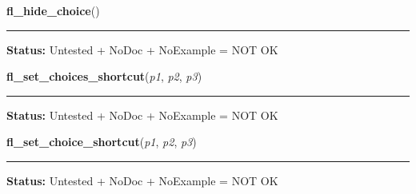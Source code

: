     \vspace{0.5ex}

\hspace{.8\funcindent}\begin{boxedminipage}{\funcwidth}

    \raggedright \textbf{fl\_hide\_choice}()

    \vspace{-1.5ex}

    \rule{\textwidth}{0.5\fboxrule}
\setlength{\parskip}{2ex}
\setlength{\parskip}{1ex}
\textbf{Status:} Untested + NoDoc + NoExample = NOT OK



    \end{boxedminipage}

    \label{xformslib:library:fl_set_choices_shortcut}

    \vspace{0.5ex}

\hspace{.8\funcindent}\begin{boxedminipage}{\funcwidth}

    \raggedright \textbf{fl\_set\_choices\_shortcut}(\textit{p1}, \textit{p2}, \textit{p3})

    \vspace{-1.5ex}

    \rule{\textwidth}{0.5\fboxrule}
\setlength{\parskip}{2ex}
\setlength{\parskip}{1ex}
\textbf{Status:} Untested + NoDoc + NoExample = NOT OK



    \end{boxedminipage}

    \label{xformslib:library:fl_set_choices_shortcut}

    \vspace{0.5ex}

\hspace{.8\funcindent}\begin{boxedminipage}{\funcwidth}

    \raggedright \textbf{fl\_set\_choice\_shortcut}(\textit{p1}, \textit{p2}, \textit{p3})

    \vspace{-1.5ex}

    \rule{\textwidth}{0.5\fboxrule}
\setlength{\parskip}{2ex}
\setlength{\parskip}{1ex}
\textbf{Status:} Untested + NoDoc + NoExample = NOT OK



    \end{boxedminipage}

